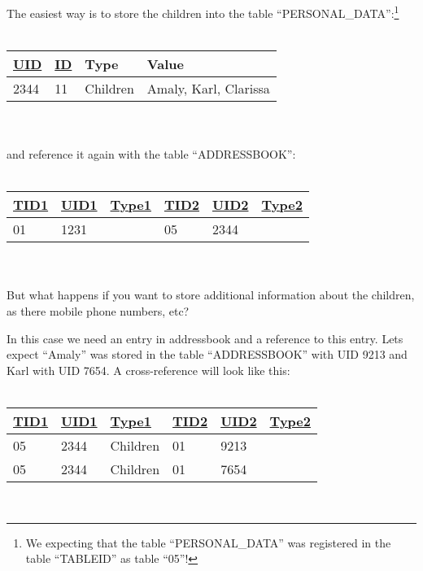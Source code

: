 The easiest way is to store the children into the table ``PERSONAL\_DATA'':\footnote{We expecting that the table ``PERSONAL\_DATA'' was registered in the table ``TABLEID'' as table ``05''!}\\
\\
\begin{tabular}[ht]{|l|l|l|l|}
\hline
\underline{UID} & \underline{ID} & Type & Value\\
\hline
 2344&  11& Children& Amaly, Karl, Clarissa\\
\hline
\end{tabular}\\
\\
and reference it again with the table ``ADDRESSBOOK'':\\
\\
\begin{tabular}[ht]{|l|l|l|l|l|l|}
\hline
\underline{TID1} & \underline{UID1} & \underline{Type1} & \underline{TID2} & \underline{UID2} & \underline{Type2} \\
\hline
 01& 1231& & 05& 2344&\\
\hline
\end{tabular}
\\
\\
But what happens if you want to store additional information about the children, as there mobile phone numbers, etc?

In this case we need an entry in addressbook and a reference to this entry. Lets expect ``Amaly'' was stored in the table ``ADDRESSBOOK'' with UID 9213 and Karl with UID 7654. A cross-reference will look like this:\\
\\
\begin{tabular}[ht]{|l|l|l|l|l|l|}
\hline
\underline{TID1} & \underline{UID1} & \underline{Type1} & \underline{TID2} & \underline{UID2} & \underline{Type2} \\
\hline
 05& 2344& Children& 01& 9213& \\
\hline
 05& 2344& Children& 01& 7654& \\
\hline
\end{tabular}
\\
